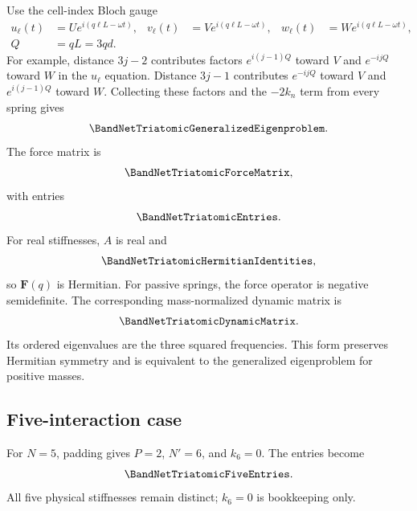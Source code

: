 Use the cell-index Bloch gauge
\begin{equation}
\begin{aligned}
    u_\ell(t)&=Ue^{i(q\ell L-\omega t)},&
    v_\ell(t)&=Ve^{i(q\ell L-\omega t)},&
    w_\ell(t)&=We^{i(q\ell L-\omega t)},\\
    Q&=qL=3qd.
\end{aligned}
\label{eq:tri-bloch}
\end{equation}
For example, distance $3j-2$ contributes factors $e^{i(j-1)Q}$ toward $V$ and
$e^{-ijQ}$ toward $W$ in the $u_\ell$ equation. Distance $3j-1$ contributes
$e^{-ijQ}$ toward $V$ and $e^{i(j-1)Q}$ toward $W$. Collecting these factors and
the $-2k_n$ term from every spring gives
\begin{equation}
    \BandNetTriatomicGeneralizedEigenproblem.
    \label{eq:tri-generalized}
\end{equation}
The force matrix is
\begin{equation}
    \BandNetTriatomicForceMatrix,
    \label{eq:tri-force}
\end{equation}
with entries
\begin{equation}
    \BandNetTriatomicEntries.
    \label{eq:tri-entries}
\end{equation}
For real stiffnesses, $A$ is real and
\begin{equation}
    \BandNetTriatomicHermitianIdentities,
    \label{eq:tri-hermitian}
\end{equation}
so $\mathbf F(q)$ is Hermitian. For passive springs, the force operator is
negative semidefinite. The corresponding mass-normalized dynamic matrix is
\begin{equation}
    \BandNetTriatomicDynamicMatrix.
    \label{eq:tri-dynamic}
\end{equation}
Its ordered eigenvalues are the three squared frequencies. This form preserves
Hermitian symmetry and is equivalent to the generalized eigenproblem for
positive masses.

\subsection{Five-interaction case}

For $N=5$, padding gives $P=2$, $N'=6$, and $k_6=0$. The entries become
\begin{equation}
    \BandNetTriatomicFiveEntries.
    \label{eq:tri-five}
\end{equation}
All five physical stiffnesses remain distinct; $k_6=0$ is bookkeeping only.

